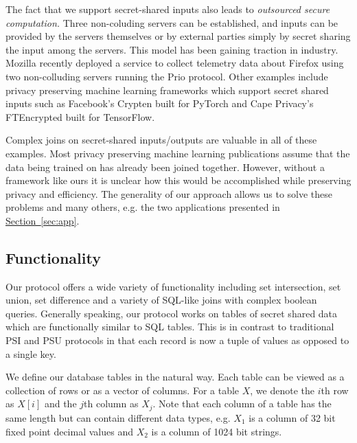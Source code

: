 \documentclass[11pt,letterpaper]{article}
\newcommand{\namedref}[2]{\hyperref[#2]{#1~\ref*{#2}}}
\newcommand{\sectionref}[1]{\namedref{Section}{#1}}
\begin{document}
The fact that we support secret-shared inputs also leads to \emph{outsourced secure computation.} Three non-coluding servers can be established, and inputs can be provided by the servers themselves or by external parties simply by secret sharing the input among the servers. This model has been gaining traction in industry. Mozilla recently deployed a service to collect telemetry data about Firefox\cite{mozilla} using two non-colluding servers running the Prio protocol\cite{DBLP:conf/nsdi/Corrigan-GibbsB17}. Other examples include privacy preserving machine learning frameworks which support secret shared inputs such as Facebook's Crypten built for PyTorch\cite{Crypten} and Cape Privacy's FTEncrypted built for TensorFlow\cite{TFEncrypted}. 

Complex joins on secret-shared inputs/outputs are valuable in all of these examples.
Most privacy preserving machine learning publications\cite{aby3,Crypten,TFEncrypted,SecureNN,XONN} assume that the data being trained on has already been joined together. However, without a framework like ours it is unclear how this would be accomplished while preserving privacy and efficiency. The generality of our approach allows us to solve these problems and many others, e.g. the two applications presented in \sectionref{sec:app}.


\subsection{Functionality}

Our protocol offers a wide variety of functionality including set intersection, set union, set difference and a variety of SQL-like joins with complex boolean queries. Generally speaking, our protocol works on tables of secret shared data which are functionally similar to SQL tables. This is in contrast to traditional PSI and PSU protocols\cite{usenix:PSZ14,USENIX:PSSZ15,PSZ16,CCS:KKRT16} in that each record is now a tuple of values as opposed to a single key. 

We define our database tables in the natural way. Each table can be viewed as a collection of rows or as a vector of columns. For a table $X$, we denote the $i$th row as $X[i]$ and the $j$th column as $X_j$. 
\iffullversion
Note that each column of a table has the same length but can contain different data types, e.g. $X_1$ is a column of 32 bit fixed point decimal values and $X_2$ is a column of 1024 bit strings.
\end{document}
